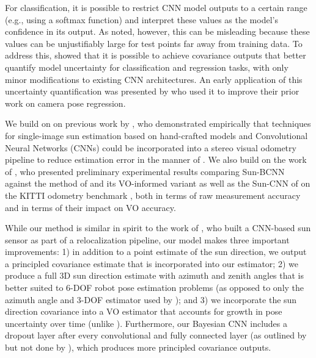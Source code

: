 For classification, it is possible to restrict CNN model outputs to a certain range (e.g., using a softmax function) and interpret these values as the model's confidence in its output. As \citet{Gal2016UncertaintyThesis} noted, however, this can be misleading because these  values can be unjustifiably large for test points far away from training data.  To address this, \citet{Gal2016-ny} showed that it is possible to achieve covariance outputs that better quantify model uncertainty for classification and regression tasks, with only minor modifications to existing CNN architectures. 
An early application of this uncertainty quantification was presented by \citet{Kendall2016-zf} who used it to improve their prior work \citep{kendall2015posenet} on camera pose regression.

We build on on previous work by \citet{Clement2016-ir}, who demonstrated empirically that techniques for single-image sun estimation based on hand-crafted models \citep{Lalonde2011-jw} and Convolutional Neural Networks (CNNs) \citep{Ma2016-at} could be incorporated into a stereo visual odometry pipeline to reduce estimation error in the manner of \citet{Lambert2012-um}.
We also build on the work of \citet{Peretroukhin2017-eb}, who presented preliminary experimental results comparing Sun-BCNN against the method of \citet{Lalonde2011-jw} and its VO-informed variant \citep{Clement2016-ir} as well as the Sun-CNN of \citet{Ma2016-at} on the KITTI odometry benchmark \citep{Geiger2012-fq,Geiger2013-ky}, both in terms of raw measurement accuracy and in terms of their impact on VO accuracy.

While our method is similar in spirit to the work of \citet{Ma2016-at}, who built a CNN-based sun sensor as part of a relocalization pipeline, our model makes three important improvements: 1) in addition to a point estimate of the sun direction, we output a principled covariance estimate that is incorporated into our estimator; 2) we produce a full 3D sun direction estimate with azimuth and zenith angles that is better suited to 6-DOF robot pose estimation problems (as opposed to only the azimuth angle and 3-DOF estimator used by \citet{Ma2016-at}); and 3) we incorporate the sun direction covariance into a VO estimator that accounts for growth in pose uncertainty over time (unlike \citet{Clement2016-ir}). 
Furthermore, our Bayesian CNN includes a dropout layer after every convolutional and fully connected layer (as outlined by \citet{Gal2016-ny} but not done by \citet{Kendall2016-zf}), which produces more principled covariance outputs.


